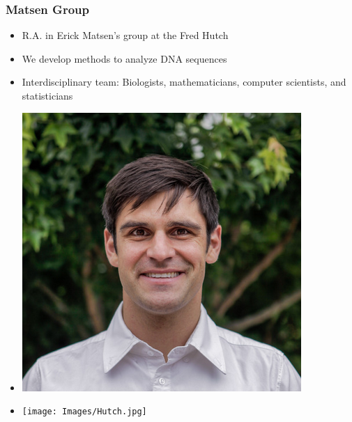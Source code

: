 \documentclass[mathserif,compress]{beamer}
\renewcommand\;{\,}
\begin{document}
\begin{frame}\frametitle{Matsen Group}
\begin{minipage}{0.49\linewidth}
\begin{itemize}
\bigskip
\item R.A. in Erick Matsen's group at the Fred Hutch
\bigskip
\item We develop methods to analyze DNA sequences
\bigskip
\item Interdisciplinary team: Biologists, mathematicians, computer scientists, and statisticians
\end{itemize}
\end{minipage}
\begin{minipage}{0.49\linewidth}
\begin{itemize}
\item[]
\begin{center}
\includegraphics[width=0.7\linewidth]{Images/Erick.png}
\end{center}
\item[]
\begin{center}
\texttt{[image: Images/Hutch.jpg]}
\end{center}
\end{itemize}
\end{minipage}
\end{frame}
\end{document}
